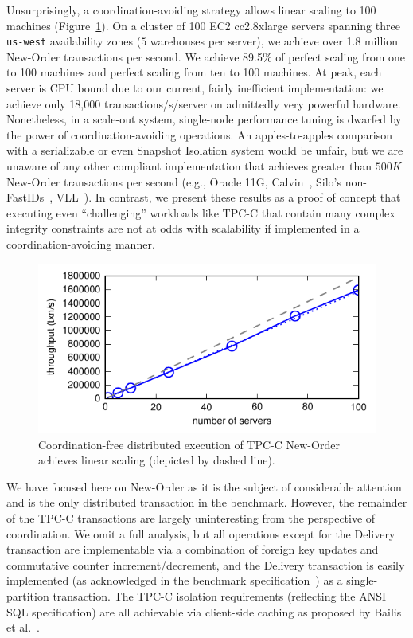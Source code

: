 Unsurprisingly, a coordination-avoiding strategy allows linear scaling
to 100 machines (Figure~\ref{fig:scaleout}). On a cluster of 100 EC2
cc2.8xlarge servers spanning three \texttt{us-west} availability zones
($5$ warehouses per server), we achieve over 1.8 million New-Order
transactions per second. We achieve 89.5\% of perfect scaling from one
to 100 machines and perfect scaling from ten to 100 machines. At peak,
each server is CPU bound due to our current, fairly inefficient
implementation: we achieve only 18,000 transactions/s/server on
admittedly very powerful hardware. Nonetheless, in a scale-out system,
single-node performance tuning is dwarfed by the power of
coordination-avoiding operations. An apples-to-apples comparison with
a serializable or even Snapshot Isolation system would be unfair, but
we are unaware of any other compliant implementation that achieves
greater than $500K$ New-Order transactions per second (e.g., Oracle
11G, Calvin~\cite{calvin}, Silo's non-FastIDs~\cite{silo},
VLL~\cite{abadi-vll}). In contrast, we present these results as a
proof of concept that executing even ``challenging'' workloads like
TPC-C that contain many complex integrity constraints are not at odds
with scalability if implemented in a coordination-avoiding manner.

\begin{figure}
\begin{center}
\includegraphics[width=\columnwidth]{figs/thru_scale.pdf}\vspace{-2em}
\end{center}
\caption{Coordination-free distributed execution of TPC-C New-Order
  achieves linear scaling (depicted by dashed line).}
\label{fig:scaleout}
\end{figure}

 We have focused here on New-Order
as it is the subject of considerable attention and is the only
distributed transaction in the benchmark. However, the remainder of
the TPC-C transactions are largely uninteresting from the perspective
of coordination. We omit a full analysis, but all operations except
for the Delivery transaction are implementable via a combination of
foreign key updates and commutative counter increment/decrement, and
the Delivery transaction is easily implemented (as acknowledged in the
benchmark specification~\cite{abadi-vll}) as a single-partition
transaction. The TPC-C isolation requirements (reflecting the ANSI SQL
specification) are all achievable via client-side caching as proposed
by Bailis et al.~\cite{hat-vldb}.


